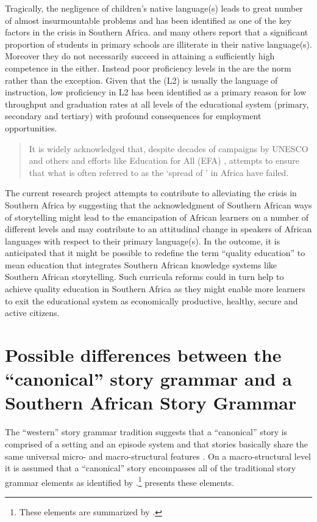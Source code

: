 \documentclass[output=paper,modfonts]{langscibook}
\begin{document}
Tragically, the negligence of children’s native language(s) leads to great number of almost insurmountable problems and has been identified as one of the key factors in the  crisis in Southern Africa. \citet[16]{Wagner2000} and many others report that a significant proportion of students in primary schools are illiterate in their native language(s). Moreover they do not necessarily succeed in attaining a sufficiently high competence in the  either. Instead poor proficiency levels in the  are the norm rather than the exception. Given that the  (L2) is usually the language of instruction, low proficiency in L2 has been identified as a primary reason for low throughput and graduation rates at all levels of the educational system (primary, secondary and tertiary) with profound consequences for employment opportunities.

\begin{quote}
It is widely acknowledged that, despite decades of  campaigns by UNESCO and others and efforts like Education for All (EFA) \citep[21]{Triebel2001}, attempts to ensure that what is often referred to as the ‘spread of ’ in Africa have failed. \citep[3]{Bloch2006}
\end{quote}

The current research project attempts to contribute to alleviating the  crisis in Southern Africa by suggesting that the acknowledgment of Southern African ways of storytelling might lead to the emancipation of African learners on a number of different levels and may contribute to an attitudinal change in speakers of African languages with respect to their primary language(s). In the outcome, it is anticipated that it might be possible to redefine the term “quality education” to mean education that integrates Southern African knowledge systems like Southern African storytelling. Such curricula reforms could in turn help to achieve quality education in Southern Africa as they might enable more learners to exit the educational system as economically productive, healthy, secure and active citizens.


\section{Possible differences between the “canonical” story grammar and a Southern African Story Grammar}\label{sec:tappe:2}


The “western” story grammar tradition suggests that a “canonical” story is comprised of a setting and an episode system and that stories basically share the same universal micro- and macro-structural features \citep{MandlerEtAl1980}. On a macro-structural level it is assumed that a “canonical” story encompasses all of the traditional story grammar elements as identified by \citet{Stein1979}.{}\footnote{These elements are summarized by \citet[541]{GriffithEtAl1986}.}  presents these elements.\\
\end{document}
